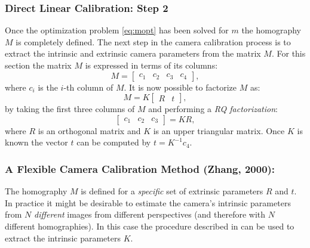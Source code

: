 \subsubsection{Direct Linear Calibration: Step 2}
Once the optimization problem \eqref{eq:mopt} has been solved for $m$ the homography $M$ is completely defined. The next step in the camera calibration process is to extract the intrinsic and extrinsic camera parameters from the matrix $M$. For this section the matrix $M$ is expressed in terms of its columns:
\begin{equation*}
M = \begin{bmatrix}
    c_1 & c_2 & c_3 & c_4
\end{bmatrix},
\end{equation*}
where $c_i$ is the $i$-th column of $M$. It is now possible to factorize $M$ as:
\begin{equation}
    M = K\begin{bmatrix}
        R & t
    \end{bmatrix},
\end{equation}
by taking the first three columns of $M$ and performing a \textit{RQ factorization}:
\begin{equation}
\begin{bmatrix}
    c_1 & c_2 & c_3
\end{bmatrix} = KR,
\end{equation}
where $R$ is an orthogonal matrix and $K$ is an upper triangular matrix. Once $K$ is known the vector $t$ can be computed by $t = K^{-1} c_4$.

\subsubsection{A Flexible Camera Calibration Method (Zhang, 2000):} \label{subsubsec:zhang}
The homography $M$ is defined for a \textit{specific} set of extrinsic parameters $R$ and $t$. In practice it might be desirable to estimate the camera's intrinsic parameters from $N$ \textit{different} images from different perspectives (and therefore with $N$ different homographies). In this case the procedure described in \cite{Zhang2000} can be used to extract the intrinsic parameters $K$. 

